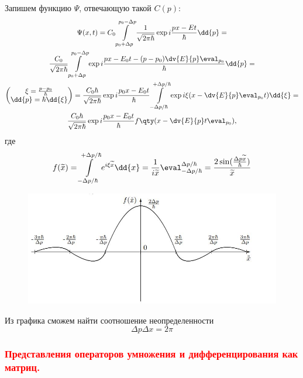 Запишем функцию $\Psi$, отвечающую такой $C(p)$:
\begin{gather*}
	\Psi(x,t)=C_0\int\limits_{p_0+ \Delta p}^{p_0 - \Delta p}
	\frac{1}{\sqrt{2\pi\hbar}}\exp{i\frac{px-Et}{\hbar}}\dd{p}=
	\\
	\frac{C_0}{\sqrt{2\pi\hbar}} \int\limits_{p_0+ \Delta p}^{p_0 - \Delta p}
	\exp{i\frac{px-E_0t-(p-p_0)\dv{E}{p}\eval_{p_0}}{\hbar}} \dd{p} =\\
	\begin{pmatrix}
		\xi=\frac{p-p_0}{\hbar} \\
		\dd{p}=\hbar \dd{\xi}
	\end{pmatrix}=
	\frac{C_0\hbar}{\sqrt{2\pi\hbar}}\exp{i\frac{p_0x-E_0t}{\hbar}}
	\int\limits_{- \Delta p/\hbar }^{+\Delta p/\hbar}
	\exp{i\xi(x-\dv{E}{p}\eval_{p_0}t)}\dd{\xi}=\\
	\frac{C_0\hbar}{\sqrt{2	\pi \hbar}}\exp{i\frac{p_0x-E_0t}{\hbar}}f\qty(x-\dv{E}{p}t\eval_{p_0}),
\end{gather*}
где
$$f(\tilde x)= \int\limits_{- \Delta p/\hbar}^{+\Delta p/\hbar} e^{i\xi\tilde x}\dd{x}
=\frac{1}{i\tilde x}\eval^{\Delta p/\hbar}_{-\Delta p/\hbar}=\frac{2\sin(\frac{\Delta p \tilde x}{\hbar})}{\tilde x}$$
\begin{figure}[H]
\centering
\includegraphics[width=0.7\linewidth]{fig/fig131}
\caption{}
\vspace{-17pt}
\end{figure}
Из графика сможем найти соотношение неопределенности
$$\Delta p \Delta x= 2\pi $$

\subsubsection{\textcolor{red} {Представления операторов умножения и дифференцирования как матриц.} }